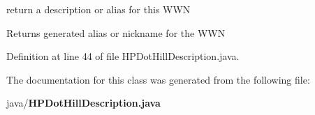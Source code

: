 return a description or alias for this W\-W\-N 

\begin{DoxyReturn}{Returns}
generated alias or nickname for the W\-W\-N 
\end{DoxyReturn}


Definition at line 44 of file H\-P\-Dot\-Hill\-Description.\-java.



The documentation for this class was generated from the following file\-:\begin{DoxyCompactItemize}
\item 
java/{\bf H\-P\-Dot\-Hill\-Description.\-java}\end{DoxyCompactItemize}
